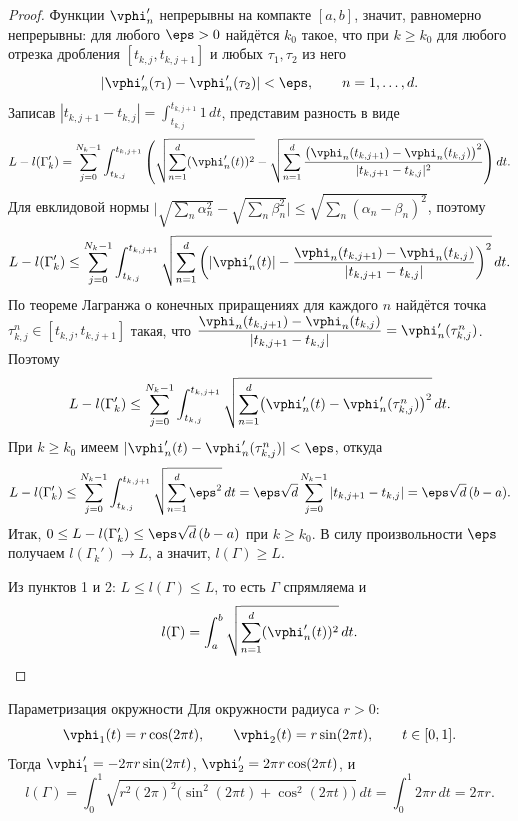 \begin{proof}
	Функции $\vphi_n'$ непрерывны на компакте $[a,b]$, значит, равномерно
	непрерывны: для любого $\eps>0$ найдётся $k_0$ такое, что при $k\ge k_0$ для
	любого отрезка дробления $[t_{k,j},t_{k,j+1}]$ и любых $\tau_1,\tau_2$ из него
	\[
	|\vphi_n'(\tau_1)-\vphi_n'(\tau_2)|<\eps,\qquad n=1,\ldots,d.
	\]
	Записав $|t_{k,j+1}-t_{k,j}|=\int_{t_{k,j}}^{t_{k,j+1}}1\,dt$, представим
	разность в виде
	\[
	L-l(\Gamma_k')
	=\sum_{j=0}^{N_k-1}\int_{t_{k,j}}^{t_{k,j+1}}
	\left(\sqrt{\sum_{n=1}^d (\vphi_n'(t))^2}
	-\sqrt{\sum_{n=1}^d
		\frac{\bigl(\vphi_n(t_{k,j+1})-\vphi_n(t_{k,j})\bigr)^2}{|t_{k,j+1}-t_{k,j}|^2}}
	\right)dt.
	\]
	Для евклидовой нормы $\bigl|\sqrt{\sum_n\alpha_n^2}-\sqrt{\sum_n\beta_n^2}\bigr|
	\le\sqrt{\sum_n(\alpha_n-\beta_n)^2}$, поэтому
	\[
	L-l(\Gamma_k')\le\sum_{j=0}^{N_k-1}\int_{t_{k,j}}^{t_{k,j+1}}
	\sqrt{\sum_{n=1}^d\left(|\vphi_n'(t)|
		-\frac{\vphi_n(t_{k,j+1})-\vphi_n(t_{k,j})}{|t_{k,j+1}-t_{k,j}|}\right)^2}\,dt.
	\]
	По теореме Лагранжа о конечных приращениях для каждого $n$ найдётся точка
	$\tau_{k,j}^n\in[t_{k,j},t_{k,j+1}]$ такая, что
	$\dfrac{\vphi_n(t_{k,j+1})-\vphi_n(t_{k,j})}{|t_{k,j+1}-t_{k,j}|}
	=\vphi_n'(\tau_{k,j}^n)$. Поэтому
	\[
	L-l(\Gamma_k')\le\sum_{j=0}^{N_k-1}\int_{t_{k,j}}^{t_{k,j+1}}
	\sqrt{\sum_{n=1}^d\bigl(\vphi_n'(t)-\vphi_n'(\tau_{k,j}^n)\bigr)^2}\,dt.
	\]
	При $k\ge k_0$ имеем $|\vphi_n'(t)-\vphi_n'(\tau_{k,j}^n)|<\eps$, откуда
	\[
	L-l(\Gamma_k')\le\sum_{j=0}^{N_k-1}\int_{t_{k,j}}^{t_{k,j+1}}
	\sqrt{\sum_{n=1}^d\eps^2}\,dt
	=\eps\sqrt{d}\sum_{j=0}^{N_k-1}|t_{k,j+1}-t_{k,j}|
	=\eps\sqrt{d}\,(b-a).
	\]
	Итак, $0\le L-l(\Gamma_k')\le\eps\sqrt{d}\,(b-a)$ при $k\ge k_0$. В силу
	произвольности $\eps$ получаем $l(\Gamma_k')\to L$, а значит, $l(\Gamma)\ge L$.
	
	\medskip
	Из пунктов 1 и 2: $L\le l(\Gamma)\le L$, то есть $\Gamma$ спрямляема и
	\[
	l(\Gamma)=\int_a^b \sqrt{\sum_{n=1}^d (\vphi_n'(t))^2}\,dt. \qedhere
	\]
\end{proof}

\begin{Example}{Параметризация окружности}{}
	Для окружности радиуса $r>0$:
	\[
	\vphi_1(t)=r\cos(2\pi t),\qquad \vphi_2(t)=r\sin(2\pi t),\qquad t\in[0,1].
	\]
	Тогда $\vphi_1'=-2\pi r\sin(2\pi t)$, $\vphi_2'=2\pi r\cos(2\pi t)$, и
	\[
	l(\Gamma)=\int_0^1\sqrt{r^2(2\pi)^2\bigl(\sin^2(2\pi t)+\cos^2(2\pi t)\bigr)}\,dt
	=\int_0^1 2\pi r\,dt=2\pi r.
	\]
\end{Example}